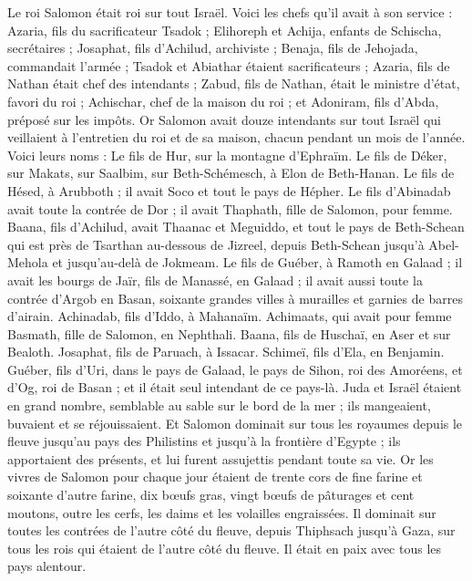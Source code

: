\begin{multicols}{2}
\VerseOne{}Le roi Salomon était roi sur tout Israël.
Voici les chefs qu'il avait à son service : Azaria, fils du sacrificateur Tsadok ;
Elihoreph et Achija, enfants de Schischa, secrétaires ; Josaphat, fils d'Achilud, archiviste ;
Benaja, fils de Jehojada, commandait l'armée ; Tsadok et Abiathar étaient sacrificateurs ;
Azaria, fils de Nathan était chef des intendants ; Zabud, fils de Nathan, était le ministre d'état, favori du roi ;
Achischar, chef de la maison du roi ; et Adoniram, fils d'Abda, préposé sur les impôts.
Or Salomon avait douze intendants sur tout Israël qui veillaient à l'entretien du roi et de sa maison, chacun pendant un mois de l'année.
Voici leurs noms : Le fils de Hur, sur la montagne d'Ephraïm.
Le fils de Déker, sur Makats, sur Saalbim, sur Beth-Schémesch, à Elon de Beth-Hanan.
Le fils de Hésed, à Arubboth ; il avait Soco et tout le pays de Hépher.
Le fils d'Abinadab avait toute la contrée de Dor ; il avait Thaphath, fille de Salomon, pour femme.
Baana, fils d'Achilud, avait Thaanac et Meguiddo, et tout le pays de Beth-Schean qui est près de Tsarthan au-dessous de Jizreel, depuis Beth-Schean jusqu'à Abel-Mehola et jusqu'au-delà de Jokmeam.
Le fils de Guéber, à Ramoth en Galaad ; il avait les bourgs de Jaïr, fils de Manassé, en Galaad ; il avait aussi toute la contrée d'Argob en Basan, soixante grandes villes à murailles et garnies de barres d'airain.
Achinadab, fils d'Iddo, à Mahanaïm.
Achimaats, qui avait pour femme Basmath, fille de Salomon, en Nephthali.
Baana, fils de Huschaï, en Aser et sur Bealoth.
Josaphat, fils de Paruach, à Issacar.
Schimeï, fils d'Ela, en Benjamin.
Guéber, fils d'Uri, dans le pays de Galaad, le pays de Sihon, roi des Amoréens, et d'Og, roi de Basan ; et il était seul intendant de ce pays-là.
Juda et Israël étaient en grand nombre, semblable au sable sur le bord de la mer ; ils mangeaient, buvaient et se réjouissaient.
Et Salomon dominait sur tous les royaumes depuis le fleuve jusqu'au pays des Philistins et jusqu'à la frontière d'Egypte ; ils apportaient des présents, et lui furent assujettis pendant toute sa vie.
Or les vivres de Salomon pour chaque jour étaient de trente cors de fine farine et soixante d'autre farine,
dix bœufs gras, vingt bœufs de pâturages et cent moutons, outre les cerfs, les daims et les volailles engraissées.
Il dominait sur toutes les contrées de l'autre côté du fleuve, depuis Thiphsach jusqu'à Gaza, sur tous les rois qui étaient de l'autre côté du fleuve. Il était en paix avec tous les pays alentour.

\end{multicols}
